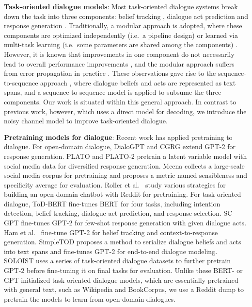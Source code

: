 \documentclass[11pt,a4paper]{article}
\begin{document}
\textbf{Task-oriented dialogue models}: Most task-oriented dialogue systems break down the task into three components: belief tracking \cite{henderson2013deep,mrkvsic2016neural,rastogi2017scalable,nouri2018toward,wu2019transferable,zhang2019find,zhou2019multi,heck2020trippy}, dialogue act prediction \cite{wen2017latent,tanaka2019dialogue} and response generation \cite{wen2015semantically,budzianowski2018multiwoz,lippe2020diversifying}. Traditionally, a modular approach is adopted, where these components are optimized independently (i.e.\ a pipeline design) or learned via multi-task learning (i.e.\ some parameters are shared among the components) \cite{wen2016network,neelakantan2019neural,zhao2019rethinking,mehri2019structured,tseng2020generative,lee2020sumbt}. However, it is known that improvements in one component do not necessarily lead to overall performance improvements \cite{ham2020end}, and the modular approach suffers from error propagation in practice \cite{liu2018end}. These observations gave rise to the sequence-to-sequence approach \cite{lei2018sequicity,pei2019modular,budzianowski2019hello,wu2019alternating,zhang2019task,ham2020end,hosseini2020simple,peng2020soloist,yang2020ubar}, where dialogue beliefs and acts are represented as text spans, and a sequence-to-sequence model is applied to subsume the three components. Our work is situated within this general approach. In contrast to previous work, however, which uses a direct model for decoding, we introduce the noisy channel model to improve task-oriented dialogue.

\textbf{Pretraining models for dialogue}: Recent work has applied pretraining \cite{peters2018deep,devlin2018bert,radford2019language} to dialogue. For open-domain dialogue, DialoGPT \cite{zhang2019dialogpt} and CGRG \cite{wu2020controllable} extend GPT-2 \cite{radford2019language} for response generation. PLATO \cite{bao2019plato} and PLATO-2 \cite{bao2020plato} pretrain a latent variable model with social media data for diversified response generation. Meena \cite{adiwardana2020towards} collects a large-scale social media corpus for pretraining and proposes a metric named sensibleness and specificity average for evaluation. Roller et al.\  study various strategies for building an open-domain chatbot with Reddit for pretraining. For task-oriented dialogue, ToD-BERT \cite{wu2020tod} fine-tunes BERT \cite{devlin2018bert} for four tasks, including intention detection, belief tracking, dialogue act prediction, and response selection. SC-GPT \cite{peng2020few} fine-tunes GPT-2 for few-shot response generation with given dialogue acts. Ham et al.\  fine-tune GPT-2 for belief tracking and context-to-response generation. SimpleTOD \cite{hosseini2020simple} proposes a method to serialize dialogue beliefs and acts into text spans and fine-tunes GPT-2 for end-to-end dialogue modeling. SOLOIST \cite{peng2020soloist} uses a series of task-oriented dialogue datasets to further pretrain GPT-2 before fine-tuning it on final tasks for evaluation. Unlike these BERT- or GPT-initialized task-oriented dialogue models, which are essentially pretrained with general text, such as Wikipedia and BookCorpus, we use a Reddit dump to pretrain the models to learn from open-domain dialogues. 
\end{document}
